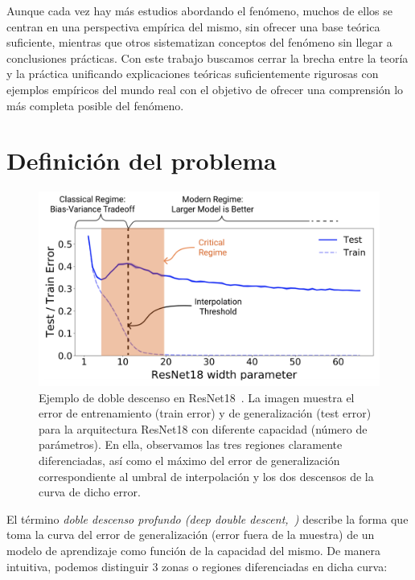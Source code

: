 Aunque cada vez hay más estudios abordando el fenómeno, muchos de ellos se centran en una perspectiva empírica del mismo, sin ofrecer una base teórica suficiente, mientras que otros sistematizan conceptos del fenómeno sin llegar a conclusiones prácticas. Con este trabajo buscamos cerrar la brecha entre la teoría y la práctica unificando explicaciones teóricas suficientemente rigurosas con ejemplos empíricos del mundo real con el objetivo de ofrecer una comprensión lo más completa posible del fenómeno.\newline


\section{Definición del problema}

\begin{figure}[h]
    \centering
    \includegraphics[width=\textwidth]{img/problem-definition.png}
    \caption[Ejemplo de doble descenso profundo en ResNet18~\cite{Nakkiran2019}.] {Ejemplo de doble descenso en ResNet18~\cite{Nakkiran2019}. La imagen muestra el error de entrenamiento (train error) y de generalización (test error) para la arquitectura ResNet18 con diferente capacidad (número de parámetros). En ella, observamos las tres regiones claramente diferenciadas, así como el máximo del error de generalización correspondiente al umbral de interpolación y los dos descensos de la curva de dicho error.}\label{fig:ejemplo-definicion-double-descent}
\end{figure}

El término \emph{doble descenso profundo (deep double descent,~\cite{Belkin2019})} describe la forma que toma la curva del error de generalización (error fuera de la muestra) de un modelo de aprendizaje como función de la capacidad del mismo. De manera intuitiva, podemos distinguir 3 zonas o regiones diferenciadas en dicha curva:

